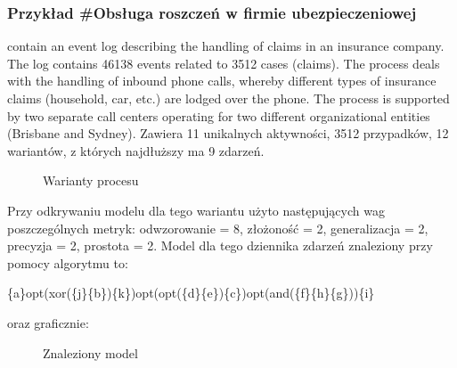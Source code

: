 \subsubsection{Przykład \#Obsługa roszczeń w firmie ubezpieczeniowej}
contain an event log describing the handling of claims in an insurance company. The log contains 46138 events related to 3512 cases (claims). The process deals with the handling of inbound phone calls, whereby different types of insurance claims (household, car, etc.) are lodged over the phone. The process is supported by two separate call centers operating for two different organizational entities (Brisbane and Sydney).
Zawiera 11 unikalnych aktywności, 3512 przypadków, 12 wariantów, z których najdłuższy ma 9 zdarzeń. 

\begin{figure}[H]
	\caption{\label{fig:flow_chart}Warianty procesu}
\end{figure}

Przy odkrywaniu modelu dla tego wariantu użyto następujących wag poszczególnych metryk: odwzorowanie = 8, złożoność = 2, generalizacja = 2, precyzja = 2, prostota = 2. Model dla tego dziennika zdarzeń znaleziony przy pomocy algorytmu to:
\begin{center}
	\{a\}opt(xor(\{j\}\{b\})\{k\})opt(opt(\{d\}\{e\})\{c\})opt(and(\{f\}\{h\}\{g\}))\{i\}
\end{center}
oraz graficznie:

\begin{figure}[H]
	\caption{\label{fig:flow_chart}Znaleziony model}
\end{figure}

